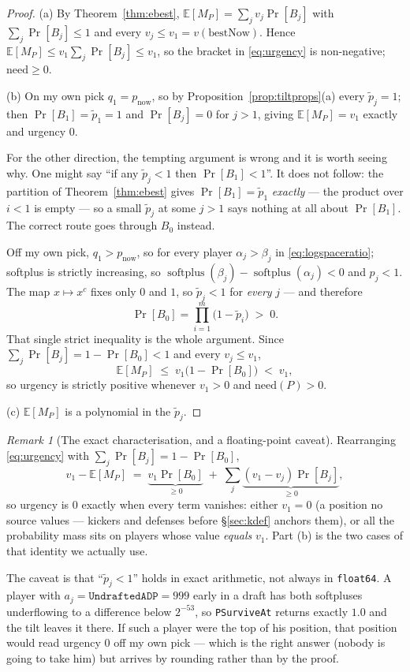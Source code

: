 \documentclass[10pt,a4paper]{article}
\theoremstyle{plain}
\theoremstyle{definition}
\theoremstyle{remark}
\newtheorem{remark}[theorem]{Remark}
\newcommand{\code}[1]{\texttt{\small #1}}
\begin{document}
\begin{proof}
(a) By Theorem~\ref{thm:ebest}, $\mathbb{E}[M_P] = \sum_j v_j\Pr[B_j]$ with
$\sum_j \Pr[B_j] \le 1$ and every $v_j \le v_1 = v(\mathrm{bestNow})$. Hence
$\mathbb{E}[M_P] \le v_1 \sum_j \Pr[B_j] \le v_1$, so the bracket in \eqref{eq:urgency}
is non-negative; $\mathrm{need} \ge 0$.

(b) On my own pick $q_1 = p_{\text{now}}$, so by Proposition~\ref{prop:tiltprops}(a)
every $\tilde p_j = 1$; then $\Pr[B_1] = \tilde p_1 = 1$ and $\Pr[B_j] = 0$ for $j > 1$,
giving $\mathbb{E}[M_P] = v_1$ exactly and urgency $0$.

For the other direction, the tempting argument is wrong and it is worth seeing why. One
might say ``if any $\tilde p_j < 1$ then $\Pr[B_1] < 1$''. It does not follow: the
partition of Theorem~\ref{thm:ebest} gives $\Pr[B_1] = \tilde p_1$ \emph{exactly} --- the
product over $i < 1$ is empty --- so a small $\tilde p_j$ at some $j > 1$ says nothing at
all about $\Pr[B_1]$. The correct route goes through $B_0$ instead.

Off my own pick, $q_1 > p_{\text{now}}$, so for every player $\alpha_j > \beta_j$ in
\eqref{eq:logspaceratio}; softplus is strictly increasing, so
$\operatorname{softplus}(\beta_j) - \operatorname{softplus}(\alpha_j) < 0$ and
$p_j < 1$. The map $x \mapsto x^{c}$ fixes only $0$ and $1$, so $\tilde p_j < 1$ for
\emph{every} $j$ --- and therefore
\[
\Pr[B_0] = \prod_{i=1}^{m}\big(1 - \tilde p_i\big) \;>\; 0 .
\]
That single strict inequality is the whole argument. Since
$\sum_j \Pr[B_j] = 1 - \Pr[B_0] < 1$ and every $v_j \le v_1$,
\[
\mathbb{E}[M_P] \;\le\; v_1\big(1 - \Pr[B_0]\big) \;<\; v_1 ,
\]
so urgency is strictly positive whenever $v_1 > 0$ and $\mathrm{need}(P) > 0$.

(c) $\mathbb{E}[M_P]$ is a polynomial in the $\tilde p_j$.
\end{proof}

\begin{remark}[The exact characterisation, and a floating-point caveat]
Rearranging \eqref{eq:urgency} with $\sum_j\Pr[B_j] = 1 - \Pr[B_0]$,
\[
v_1 - \mathbb{E}[M_P] \;=\; \underbrace{v_1 \Pr[B_0]}_{\ge 0}
\;+\; \sum_{j}\underbrace{(v_1 - v_j)\Pr[B_j]}_{\ge 0},
\]
so urgency is $0$ exactly when every term vanishes: either $v_1 = 0$ (a position no
source values --- kickers and defenses before \S\ref{sec:kdef} anchors them), or all the
probability mass sits on players whose value \emph{equals} $v_1$. Part (b) is the two
cases of that identity we actually use.

The caveat is that ``$\tilde p_j < 1$'' holds in exact arithmetic, not always in
\code{float64}. A player with $a_j = \texttt{UndraftedADP} = 999$ early in a draft has
both softpluses underflowing to a difference below $2^{-53}$, so \code{PSurviveAt} returns
exactly $1.0$ and the tilt leaves it there. If such a player were the top of his position,
that position would read urgency $0$ off my own pick --- which is the right answer
(nobody is going to take him) but arrives by rounding rather than by the proof.
\end{remark}
\end{document}
